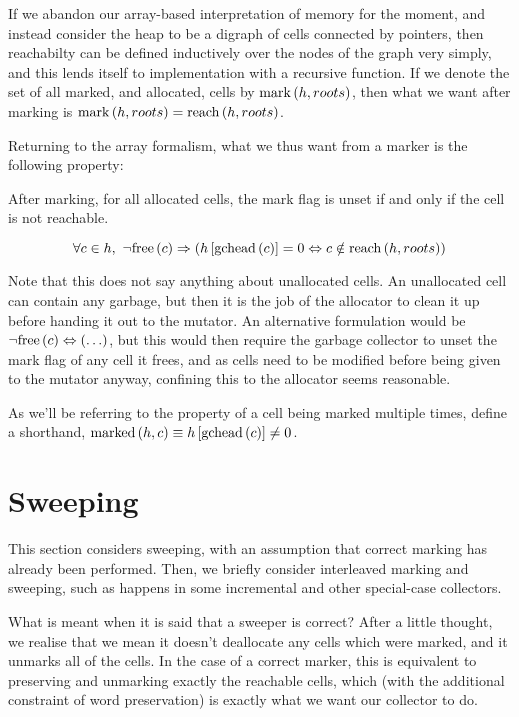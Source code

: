 If we abandon our array-based interpretation of memory for the moment,
and instead consider the heap to be a digraph of cells connected by
pointers, then reachabilty can be defined inductively over the nodes
of the graph very simply, and this lends itself to implementation with
a recursive function. If we denote the set of all marked, and
allocated, cells by $\mathrm{mark}\left(h, roots\right)$, then what we want after
marking is $\mathrm{mark}\left(h, roots\right) = \mathrm{reach}\left(h, roots\right)$.

Returning to the array formalism, what we thus want from a marker is
the following property:

\begin{definition}
  \label{def:ms-correct-marking}
  After marking, for all allocated cells, the mark flag is unset if
  and only if the cell is not reachable.

  \[\forall c \in h,\ \lnot\mathrm{free}\left(c\right) \Rightarrow
  \left(h\left[\mathrm{gchead}\left(c\right)\right] = 0 \Leftrightarrow c \notin
    \mathrm{reach}\left(h, roots\right)\right)\]
\end{definition}

Note that this does not say anything about unallocated cells. An
unallocated cell can contain any garbage, but then it is the job of
the allocator to clean it up before handing it out to the mutator. An
alternative formulation would be $\lnot\mathrm{free}\left(c\right) \Leftrightarrow
\left(\ldots\right)$, but this would then require the garbage
collector to unset the mark flag of any cell it frees, and as cells
need to be modified before being given to the mutator anyway,
confining this to the allocator seems reasonable.

As we'll be referring to the property of a cell being marked multiple
times, define a shorthand, $\mathrm{marked}\left(h, c\right) \equiv
h\left[\mathrm{gchead}\left(c\right)\right] \neq 0$.

\section{Sweeping}
\label{sec:marksweep-sweeping}

This section considers sweeping, with an assumption that correct
marking has already been performed. Then, we briefly consider
interleaved marking and sweeping, such as happens in some incremental
and other special-case collectors.

What is meant when it is said that a sweeper is correct? After a
little thought, we realise that we mean it doesn't deallocate any
cells which were marked, and it unmarks all of the cells. In the case
of a correct marker, this is equivalent to preserving and unmarking
exactly the reachable cells, which (with the additional constraint of
word preservation) is exactly what we want our collector to do.

